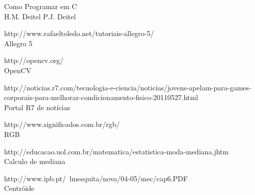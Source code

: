 \documentclass[a4paper]{article}
\begin{document}
\begin{thebibliography}{7}
 Como Programar em C \\
\newblock H.M. Deitel P.J. Deitel

 http://www.rafaeltoledo.net/tutoriais-allegro-5/ \\
\newblock Allegro 5

 http://opencv.org/ \\
\newblock OpenCV

http://noticias.r7.com/tecnologia-e-ciencia/noticias/jovens-apelam-para-games-corporais-para-melhorar-condicionamento-fisico-20110527.html
\\
\newblock Portal R7 de notícias

 http://www.significados.com.br/rgb/
\\
\newblock RGB

http://educacao.uol.com.br/matematica/estatistica-moda-mediana.jhtm
\\
\newblock Calculo de mediana

 http://www.ipb.pt/~lmesquita/nova/04-05/mec/cap6.PDF
\\
\newblock Centróide 
\end{thebibliography}
\end{document}
